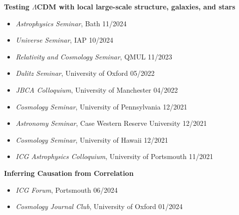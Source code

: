 \documentclass[11pt]{article}
\newenvironment{outerlist}[1][\enskip\textbullet]%
        {\begin{itemize}[#1]}{\end{itemize}%
         \vspace{-.6\baselineskip}}
\newcommand{\blankline}{\quad\pagebreak[2]}
\begin{document}
\blankline

\textbf{Testing $\Lambda$CDM with local large-scale structure, galaxies, and stars}
\vspace{-0.35\baselineskip}
\begin{outerlist}
\item[] \textit{Astrophysics Seminar}, Bath \hfill 11/2024 \\
\vspace{-1.4\baselineskip}
\item[] \textit{Universe Seminar}, IAP \hfill 10/2024 \\
\vspace{-1.4\baselineskip}
\item[] \textit{Relativity and Cosmology Seminar}, QMUL \hfill 11/2023 \\
\vspace{-1.4\baselineskip}
\item[] \textit{Dalitz Seminar}, University of Oxford \hfill 05/2022 \\
\vspace{-1.4\baselineskip}
\item[] \textit{JBCA Colloquium}, University of Manchester \hfill 04/2022 \\
\vspace{-1.4\baselineskip}
\item[] \textit{Cosmology Seminar}, University of Pennsylvania \hfill 12/2021 \\
\vspace{-1.4\baselineskip}
\item[] \textit{Astronomy Seminar}, Case Western Reserve University \hfill 12/2021 \\
\vspace{-1.4\baselineskip}
\item[] \textit{Cosmology Seminar}, University of Hawaii \hfill 12/2021 \\
\vspace{-1.4\baselineskip}
\item[] \textit{ICG Astrophysics Colloquium}, University of Portsmouth \hfill 11/2021 \\
\vspace{-1.\baselineskip}
\end{outerlist}

\blankline

\textbf{Inferring Causation from Correlation}
\vspace{-0.35\baselineskip}
\begin{outerlist}
\item[] \textit{ICG Forum}, Portsmouth \hfill 06/2024 \\
\vspace{-1.4\baselineskip}
\item[] \textit{Cosmology Journal Club}, University of Oxford \hfill 01/2024 \\
\vspace{-1.\baselineskip}
\end{outerlist}
\end{document}
